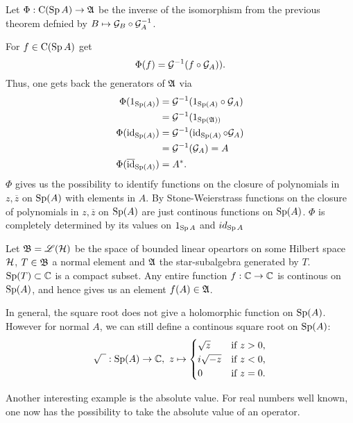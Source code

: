 \begin{rem}
  Let $\Phi : \operatorname{C} (\operatorname{Sp} A) \to \mathfrak{A}$ be the inverse of the isomorphism from the previous theorem defnied by $B \mapsto \mathcal{G}_B \circ \mathcal{G}_A ^{-1}$.
 
  For $f \in \operatorname{C}(\operatorname{Sp} A)$ get 
  \[
   \Phi (f) = \mathcal{G} ^{-1} (f \circ \mathcal{G}_A)).
  \]
  Thus, one gets back the generators of $\mathfrak{A}$ via
   \begin{align*}
      \Phi (1_{\operatorname{Sp}(A)})   		&= \mathcal{G} ^{-1} (1 _{\operatorname{Sp}(A)} \circ \mathcal{G}_A ) \\
				    &= \mathcal{G} ^{-1} (1_{\operatorname{Sp}(\mathfrak{A}))} \\
      \Phi (\operatorname{id}_{\operatorname{Sp} (A)})		&= \mathcal{G} ^{-1} (\operatorname{id}_{\operatorname{Sp} (A)} \circ \mathcal{G}_A) \\
				    &= \mathcal{G} ^{-1} (\mathcal{G}_A) = A \\
      \Phi (\overline{\operatorname{id}}_{\operatorname{Sp} (A)}) 	&= A^*.
   \end{align*}
  $\Phi$ gives us the possibility to identify functions on the closure of polynomials in $z, \overline{z}$ on $\operatorname{Sp} (A)$ with elements in $A$. By Stone-Weierstrass functions on the closure of polynomials in $z, \overline{z}$ on $\operatorname{Sp} (A)$ are just continous functions on $\operatorname{Sp} (A)$. $\Phi$ is completely determined by its values on $1_{\operatorname{Sp} A}$ and $id_{\operatorname{Sp} A}$
\end{rem}

\begin{expl}
 Let $\mathfrak{B} = \mathscr{L}(\mathcal{H})$ be the space of bounded linear opeartors on some Hilbert space $\mathcal{H}$, $T \in \mathfrak{B}$ a normal element and $\mathfrak{A}$ the star-subalgebra generated by $T$. $\operatorname{Sp} (T) \subset \mathbb{C}$ is a compact subset. Any entire function $f : \mathbb{C} \to \mathbb{C}$ is continous on $\operatorname{Sp} (A)$, and hence gives us an element $f(A) \in \mathfrak{A}$. 
 
 In general, the square root does not give a holomorphic function on $\operatorname{Sp} (A)$. However for normal $A$, we can still define a continous square root on $\operatorname{Sp} (A)$:
 \[
  \sqrt{\phantom{z}} : \operatorname{Sp} (A) \to \mathbb{C}, ~ z \mapsto 
  \begin{cases}
    \sqrt{z} 	& \text{if $z > 0$,} \\
    i \sqrt{-z}	& \text{if $ z < 0$,} \\
    0		& \text{if $ z = 0$.}
  \end{cases}
 \]

 Another interesting example is the absolute value. For real numbers well known, one now has the possibility to take the absolute value of an operator.
\end{expl}

